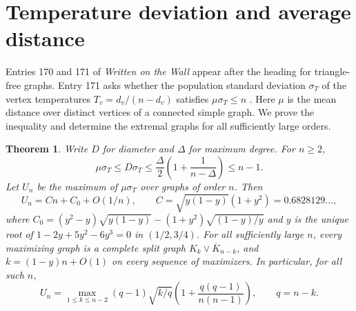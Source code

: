 \documentclass[11pt,a4paper]{article}
\newtheorem{theorem}{Theorem}[section]
\theoremstyle{remark}\newtheorem*{remark}{Remark}
\begin{document}
\section{Temperature deviation and average distance}
\label{sec:temp171}
Entries 170 and 171 of \emph{Written on the Wall} appear after the heading for triangle-free graphs. Entry 171 asks whether the population standard
deviation $\sigma_T$ of the vertex temperatures
$T_v=d_v/(n-d_v)$ satisfies $\mu\sigma_T\le n$
\cite[pp.~67--69]{wow}. Here $\mu$ is the mean distance over
distinct vertices of a connected simple graph. We prove the inequality and
determine the extremal graphs for all sufficiently large orders.

\begin{theorem}\label{thm:temp171}
Write $D$ for diameter and $\Delta$ for maximum degree. For $n\ge2$,
\[
 \mu\sigma_T\le D\sigma_T\le
 \frac{\Delta}{2}\left(1+\frac{1}{n-\Delta}\right)\le n-1.
\]
Let $U_n$ be the maximum of $\mu\sigma_T$ over graphs of order $n$. Then
\[
 U_n=Cn+C_0+O(1/n),\qquad
 C=\sqrt{y(1-y)}(1+y^2)=0.6828129\ldots,
\]
where $C_0=(y^2-y)\sqrt{y(1-y)}-(1+y^2)\sqrt{(1-y)/y}$ and $y$ is the unique root of $1-2y+5y^2-6y^3=0$ in $(1/2,3/4)$.
For all sufficiently large $n$, every maximizing graph is a complete
split graph $K_k\vee\overline K_{n-k}$, and $k=(1-y)n+O(1)$ on every
sequence of maximizers. In particular, for all such $n$,
\[
 U_n=\max_{1\le k\le n-2}
 (q-1)\sqrt{k/q}\left(1+\frac{q(q-1)}{n(n-1)}\right),
 \qquad q=n-k .
\]
\end{theorem}
\end{document}
